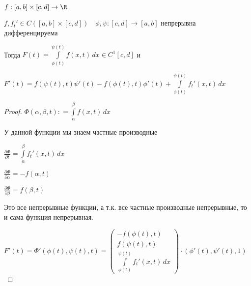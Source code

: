 \begin{theorem}\thmslashn
	
	$f:[a, b] \times [c, d] \to \R$
	
	$f, f_t' \in C([a, b] \times [c, d]) \quad \phi, \psi : [c, d]\to [a, b]$ непрерывна дифференцируема
	
	Тогда $F(t) = \int\limits_{\phi(t)}^{\psi(t)} f(x, t) \,dx \in C^1[c,d]$ и 
	
	$F'(t) = f(\psi(t), t) \psi'(t) - f(\phi(t), t)\phi'(t) + \int\limits_{\phi(t)}^{\psi(t)} f_t'(x, t)\,dx$
	
\end{theorem}


\begin{proof}\thmslashn
	
	$\Phi(\alpha, \beta, t): = \int\limits_{\alpha}^{\beta} f(x, t)\,dx$ 
	
	У данной функции мы знаем частные производные
	
	$ \frac{\partial \Phi}{\partial t} = \int\limits_{\alpha}^{\beta} f_t'(x, t)\,dx $
	
	$ \frac{\partial \Phi}{\partial \alpha} = -f(\alpha, t) $
	
	$ \frac{\partial \Phi}{\partial \beta} = f(\beta, t) $
	
	Это все непрерывные функции, а т.к. все частные производные непрерывные, то и сама функция непрерывная.
	
	$F'(t) = \Phi'(\phi(t), \psi(t), t) = \begin{pmatrix}
	-f(\phi(t), t)\\
	f(\psi(t), t) \\
	\int\limits_{\phi(t)}^{\psi(t)} f_t'(x, t)\,dx
	\end{pmatrix} \cdot (\phi'(t), \psi'(t), 1)$
	
\end{proof}


